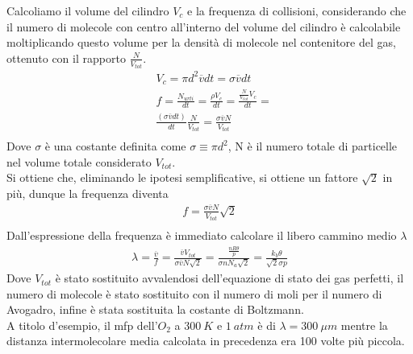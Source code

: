 \documentclass[
10pt, %
a4paper, %
oneside, %
headinclude,footinclude, %
BCOR5mm, %
]{scrartcl}
\begin{document}
\FloatBarrier
Calcoliamo il volume del cilindro $V_c$ e la frequenza di collisioni, considerando che il numero di molecole con centro all'interno del volume del cilindro è calcolabile moltiplicando questo volume per la densità di molecole nel contenitore del gas, ottenuto con il rapporto $\frac{N}{V_{tot}}$. 
\begin{align*} 
	&V_c = \pi d^2 \overline{v} dt = \sigma \overline{v} dt\\
	&f = \frac{N_{urti}}{dt}=\frac{\rho V_c}{dt} = \frac{\frac{N}{V_{tot}}V_c}{dt}=\\
	&\frac{\left(\sigma \overline{v} dt\right)}{dt} \frac{N}{V_{tot}} = \frac{\sigma \overline{v} N}{V_{tot}}\\
\end{align*} 
Dove $\sigma$ è una costante definita come $\sigma \equiv \pi d^2$, N è il numero totale di particelle nel volume totale considerato \(V_{tot}\).\\
Si ottiene che, eliminando le ipotesi semplificative, si ottiene un fattore $\sqrt{2}$ in più, dunque la frequenza diventa
\begin{align*} 
	f = \frac{\sigma \overline{v} N}{V_{tot}}\sqrt{2}\\
\end{align*} 
Dall'espressione della frequenza è immediato calcolare il libero cammino medio $\lambda$
\begin{align*} 
	\lambda = \frac{\overline{v}}{f} = \frac{\overline{v} V_{tot}}{\sigma \overline{v} N\sqrt{2}} = \frac{ \frac{n R\theta}{p} }{\sigma n N_a \sqrt{2}} = \frac{k_b\theta}{\sqrt{2}\sigma p}
\end{align*} 
Dove $V_{tot}$ è stato sostituito avvalendosi dell'equazione di stato dei gas perfetti, il numero di molecole è stato sostituito con il numero di moli per il numero di Avogadro, infine è stata sostituita la costante di Boltzmann.\\
A titolo d'esempio, il mfp dell'$O_2$ a $300\ K$ e $1\ atm$ è di $\lambda = 300\ \mu m$ mentre la distanza intermolecolare media calcolata in precedenza era 100 volte più piccola. 
\newpage
\end{document}
